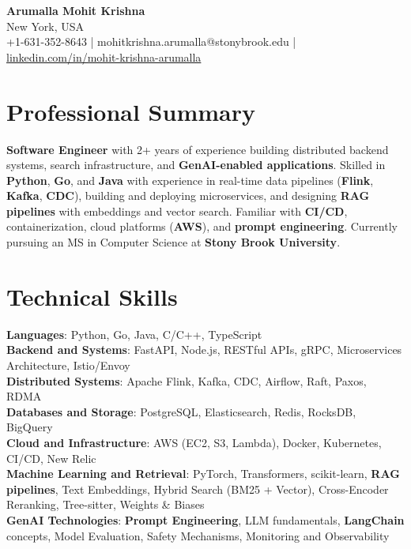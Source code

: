 \documentclass[letterpaper,11pt]{article}
\begin{document}
\begin{center}
  {\Large \textbf{Arumalla Mohit Krishna}} \\
  New York, USA \\
  +1-631-352-8643 \enspace | \enspace mohitkrishna.arumalla@stonybrook.edu \enspace | \enspace \href{https://www.linkedin.com/in/mohit-krishna-arumalla}{linkedin.com/in/mohit-krishna-arumalla}
\end{center}

\section{Professional Summary}
  \begin{itemize}[leftmargin=0.15in, label={}]
    \small{\item{
     \textbf{Software Engineer} with 2+ years of experience building distributed backend systems, search infrastructure, and \textbf{GenAI-enabled applications}. Skilled in \textbf{Python}, \textbf{Go}, and \textbf{Java} with experience in real-time data pipelines (\textbf{Flink}, \textbf{Kafka}, \textbf{CDC}), building and deploying microservices, and designing \textbf{RAG pipelines} with embeddings and vector search. Familiar with \textbf{CI/CD}, containerization, cloud platforms (\textbf{AWS}), and \textbf{prompt engineering}. Currently pursuing an MS in Computer Science at \textbf{Stony Brook University}.
    }}
  \end{itemize}
\vspace{-16pt}

\section{Technical Skills}
 \begin{itemize}[leftmargin=0.15in, label={}]
    \small{\item{
     \textbf{Languages}: Python, Go, Java, C/C++, TypeScript \\
     \textbf{Backend and Systems}: FastAPI, Node.js, RESTful APIs, gRPC, Microservices Architecture, Istio/Envoy \\
     \textbf{Distributed Systems}: Apache Flink, Kafka, CDC, Airflow, Raft, Paxos, RDMA \\
     \textbf{Databases and Storage}: PostgreSQL, Elasticsearch, Redis, RocksDB, BigQuery \\
     \textbf{Cloud and Infrastructure}: AWS (EC2, S3, Lambda), Docker, Kubernetes, CI/CD, New Relic \\
     \textbf{Machine Learning and Retrieval}: PyTorch, Transformers, scikit-learn, \textbf{RAG pipelines}, Text Embeddings, Hybrid Search (BM25 + Vector), Cross-Encoder Reranking, Tree-sitter, Weights \& Biases \\
     \textbf{GenAI Technologies}: \textbf{Prompt Engineering}, LLM fundamentals, \textbf{LangChain} concepts, Model Evaluation, Safety Mechanisms, Monitoring and Observability
    }}
 \end{itemize}
\vspace{-16pt}
\end{document}
